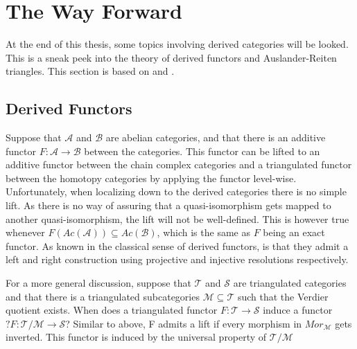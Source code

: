 \section{The Way Forward}

    At the end of this thesis, some topics involving derived categories will be looked. This is a sneak peek into the theory of derived functors and Auslander-Reiten triangles. This section is based on \cite{happel} and \cite{Kel96}. 

    \subsection{Derived Functors}

        Suppose that $\mathcal{A}$ and $\mathcal{B}$ are abelian categories, and that there is an additive functor $F:\mathcal{A}\rightarrow\mathcal{B}$ between the categories. This functor can be lifted to an additive functor between the chain complex categories and a triangulated functor between the homotopy categories by applying the functor level-wise. Unfortunately, when localizing down to the derived categories there is no simple lift. As there is no way of assuring that a quasi-isomorphism gets mapped to another quasi-isomorphism, the lift will not be well-defined. This is however true whenever $F(Ac(\mathcal{A}))\subseteq Ac(\mathcal{B})$, which is the same as $F$ being an exact functor. As known in the classical sense of derived functors, is that they admit a left and right construction using projective and injective resolutions respectively.

        \begin{center}
        \end{center}

        For a more general discussion, suppose that $\mathcal{T}$ and $\mathcal{S}$ are triangulated categories and that there is a triangulated subcategories $\mathcal{M}\subseteq\mathcal{T}$ such that the Verdier quotient exists. When does a triangulated functor $F:\mathcal{T}\rightarrow\mathcal{S}$ induce a functor $?F : \mathcal{T}/\mathcal{M}\rightarrow \mathcal{S}$? Similar to above, F admits a lift if every morphism in $Mor_{\mathcal{M}}$ gets inverted. This functor is induced by the universal property of $\mathcal{T}/\mathcal{M}$


